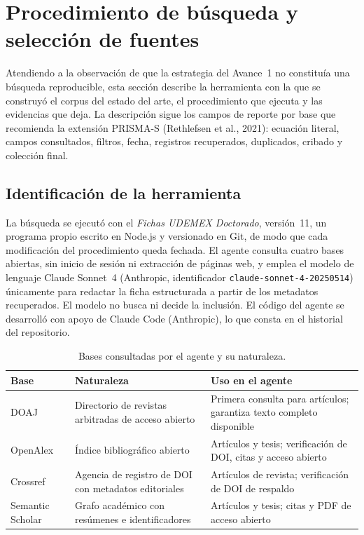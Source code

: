 %

\section{Procedimiento de búsqueda y selección de fuentes}
\label{sec:agente}

Atendiendo a la observación de que la estrategia del Avance~1 no constituía
una búsqueda reproducible, esta sección describe la herramienta con la que se
construyó el corpus del estado del arte, el procedimiento que ejecuta y las
evidencias que deja. La descripción sigue los campos de reporte por base que
recomienda la extensión PRISMA-S (Rethlefsen et al., 2021): ecuación literal,
campos consultados, filtros, fecha, registros recuperados, duplicados,
cribado y colección final.

\subsection{Identificación de la herramienta}

La búsqueda se ejecutó con el \emph{Fichas UDEMEX Doctorado},
versión~11, un programa propio escrito en Node.js y versionado en Git, de
modo que cada modificación del procedimiento queda fechada. El agente consulta
cuatro bases abiertas, sin inicio de sesión ni extracción de páginas web, y
emplea el modelo de lenguaje Claude Sonnet~4 (Anthropic, identificador
\texttt{claude-sonnet-4-20250514}) únicamente para redactar la ficha
estructurada a partir de los metadatos recuperados. El modelo no busca ni
decide la inclusión. El código del agente se desarrolló con apoyo de Claude
Code (Anthropic), lo que consta en el historial del repositorio.

\begin{table}[htbp]\centering\small
\caption{Bases consultadas por el agente y su naturaleza.}
\label{tab:bases}
\begin{tabular}{@{}p{3.1cm}p{5.3cm}p{5.6cm}@{}}
\toprule
Base & Naturaleza & Uso en el agente \\
\midrule
DOAJ & Directorio de revistas arbitradas de acceso abierto & Primera consulta para artículos; garantiza texto completo disponible \\
OpenAlex & Índice bibliográfico abierto & Artículos y tesis; verificación de DOI, citas y acceso abierto \\
Crossref & Agencia de registro de DOI con metadatos editoriales & Artículos de revista; verificación de DOI de respaldo \\
Semantic Scholar & Grafo académico con resúmenes e identificadores & Artículos y tesis; citas y PDF de acceso abierto \\
\bottomrule
\end{tabular}
\end{table}

